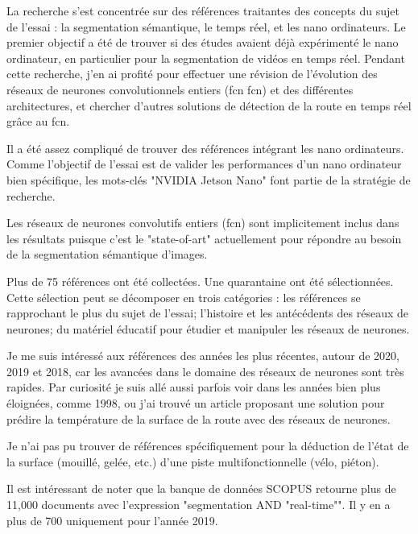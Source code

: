 ﻿\par La recherche s'est concentrée sur des références traitantes des concepts du sujet de l'essai : la segmentation sémantique, le temps réel, et les nano ordinateurs. Le premier objectif a été de trouver si des études avaient déjà expérimenté le nano ordinateur, en particulier pour la segmentation de vidéos en temps réel. Pendant cette recherche, j'en ai profité pour effectuer une révision de l'évolution des réseaux de neurones convolutionnels entiers (\acrshort{fcn} \acrlong{fcn})  et des différentes architectures, et chercher d'autres solutions de détection de la route en temps réel grâce au \acrshort{fcn}. 
\par Il a été assez compliqué de trouver des références intégrant les nano ordinateurs. Comme l'objectif de l'essai est de valider les performances d'un nano ordinateur bien spécifique, les mots-clés "NVIDIA Jetson Nano" font partie de la stratégie de recherche. 
\par Les réseaux de neurones convolutifs entiers (\acrshort{fcn}) sont implicitement inclus dans les résultats puisque c'est le "state-of-art" actuellement pour répondre au besoin de la segmentation sémantique d'images.
\par Plus de 75 références ont été collectées. Une quarantaine ont été sélectionnées. Cette sélection peut se décomposer en trois catégories : les références se rapprochant le plus du sujet de l'essai; l'histoire et les antécédents des réseaux de neurones; du matériel éducatif pour étudier et manipuler les réseaux de neurones.
\par Je me suis intéressé aux références des années les plus récentes, autour de 2020, 2019 et 2018, car les avancées dans le domaine des réseaux de neurones sont très rapides. Par curiosité je suis allé aussi parfois voir dans les années bien plus éloignées, comme 1998, ou j'ai trouvé un article proposant une solution pour prédire la température de la surface de la route avec des réseaux de neurones.
\par Je n'ai pas pu trouver de références spécifiquement pour la déduction de l'état de la surface (mouillé, gelée, etc.) d'une piste multifonctionnelle (vélo, piéton). 
\par Il est intéressant de noter que la banque de données SCOPUS retourne plus de 11,000 documents avec l'expression "segmentation AND "real-time"". Il y en a plus de 700 uniquement pour l'année 2019. 